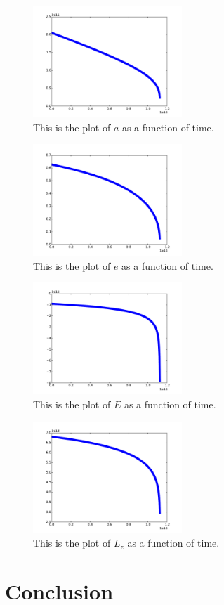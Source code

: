\documentclass[11pt,letterpaper]{article}
\begin{document}
\begin{figure}[bth]
\centering
\includegraphics[width=0.5\textwidth]{billion_figs/semi-major_axis.pdf}
\caption{This is the plot of $a$ as a function of time.}
\label{fig:simpleplot2}
\end{figure}

\begin{figure}[bth]
\centering
\includegraphics[width=0.5\textwidth]{billion_figs/eccentricity.pdf}
\caption{This is the plot of $e$ as a function of time.}
\label{fig:simpleplot2}
\end{figure}

\begin{figure}[bth]
\centering
\includegraphics[width=0.5\textwidth]{billion_figs/energy.pdf}
\caption{This is the plot of $E$ as a function of time.}
\label{fig:simpleplot2}
\end{figure}

\begin{figure}[bth]
\centering
\includegraphics[width=0.5\textwidth]{billion_figs/angular_momentum.pdf}
\caption{This is the plot of $L_z$ as a function of time.}
\label{fig:simpleplot2}
\end{figure}

\section{Conclusion}
\end{document}
